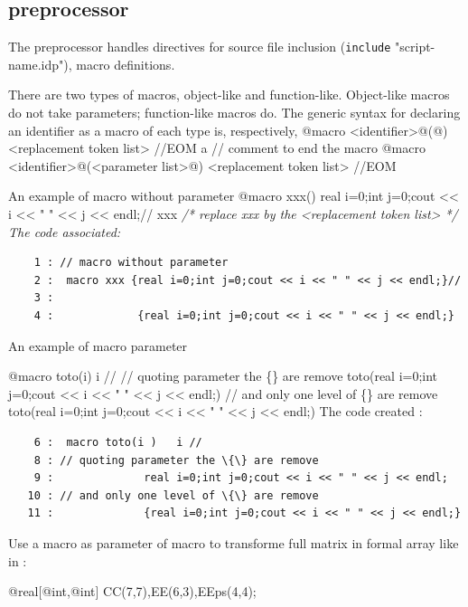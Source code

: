 \documentclass[a4paper,twoside,12pt]{book}
\begin{document}
\subsection{preprocessor}
The preprocessor handles directives for source file inclusion (\texttt{include} "script-name.idp"), macro definitions.

There are two types of macros, object-like and function-like. Object-like macros do not take parameters; function-like macros do. The generic syntax for declaring an identifier as a macro of each type is, respectively,
\bFF
@macro <identifier>@(@)  <replacement token list>  //EOM  a // comment  to end the macro
@macro <identifier>@(<parameter list>@) <replacement token list> //EOM 
\eFF

An example of macro without parameter 
\bFF
@macro xxx() {real i=0;int j=0;cout << i << " " << j << endl;}//
xxx \it/* replace xxx by the <replacement token list> */
\eFF
 The \freefempp code associated: 
\begin{verbatim}
    1 : // macro without parameter 
    2 :  macro xxx {real i=0;int j=0;cout << i << " " << j << endl;}//
    3 : 
    4 :             {real i=0;int j=0;cout << i << " " << j << endl;}
\end{verbatim}

An example of macro parameter 

\bFF
@macro toto(i) i //
// quoting parameter the \{\} are remove
toto({real i=0;int j=0;cout << i << " " << j << endl;})
// and only one level of \{\} are remove 
toto({{real i=0;int j=0;cout << i << " " << j << endl;}})
\eFF
 The \freefempp code created :
\begin{verbatim}
    6 :  macro toto(i )   i // 
    8 : // quoting parameter the \{\} are remove
    9 :              real i=0;int j=0;cout << i << " " << j << endl; 
   10 : // and only one level of \{\} are remove 
   11 :              {real i=0;int j=0;cout << i << " " << j << endl;} 
\end{verbatim}

Use a  macro as parameter of macro 
to transforme full matrix in formal array like in :

\bFF
@real[@int,@int] CC(7,7),EE(6,3),EEps(4,4);
\end{document}
